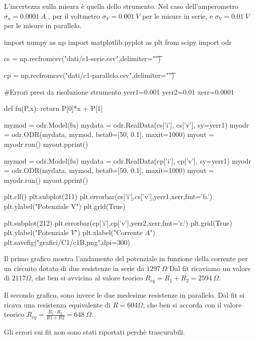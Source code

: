 L'incertezza sulla misura è quella dello strumento. Nel caso dell'amperometro $\sigma_a = 0.0001\ A$ , per il voltmetro
$\sigma_V = 0.001\ V$ per le misure in serie, e $\sigma_V = 0.01\ V$ per le misure in parallelo.
\\

\begin{sagesilent}
 
 import numpy as np
 import matplotlib.pyplot as plt
 from scipy import odr

 cs = np.recfromcsv("dati/c1-serie.csv",delimiter="\t")
 
 cp = np.recfromcsv("dati/c1-parallelo.csv",delimiter="\t")

 #Errori presi da risoluzione strumento
 yerr1=0.001
 yerr2=0.01
 xerr=0.0001
 
 def fu(P,x):
    return P[0]*x + P[1]

 mymod = odr.Model(fu)
 mydata = odr.RealData(cs['i'], cs['v'], sy=yerr1)
 myodr = odr.ODR(mydata, mymod, beta0=[50, 0.1], maxit=1000)
 myout = myodr.run()
 myout.pprint()
 
 mymod = odr.Model(fu)
 mydata = odr.RealData(cp['i'], cp['v'], sy=yerr1)
 myodr = odr.ODR(mydata, mymod, beta0=[50, 0.1], maxit=1000)
 myout = myodr.run()
 myout.pprint()

 plt.clf()
 plt.subplot(211)
 plt.errorbar(cs['i'],cs['v'],yerr1,xerr,fmt='b.')
 plt.ylabel("Potenziale V")
 plt.grid(True)
 
 plt.subplot(212)
 plt.errorbar(cp['i'],cp['v'],yerr2,xerr,fmt='r.')
 plt.grid(True)
 plt.ylabel("Potenziale $V$")
 plt.xlabel("Corrente $A$")
 plt.savefig("grafici/C1/c1B.png",dpi=300)
 
\end{sagesilent}


Il primo grafico mostra l'andamento del potenziale in funzione della corrente per un circuito dotato di due resistenze in serie da $1297\ \Omega$
Dal fit ricaviamo un valore di $2117 \Omega$, che ben si avvicina al valore teorico $R_{eq}=R_1+R_2= 2594\ \Omega$.

Il secondo grafico, sono invece le due medesime resistenze in parallelo. Dal fit si ricava una resistenza equivalente di
$R = 604 \Omega$, che ben si accorda con il valore teorico $R_{eq} = \frac{R_1 \cdot R_2}{R1+R2}=648\ \Omega$.

Gli errori sui fit non sono stati riportati perchè trascurabili. 
\\

